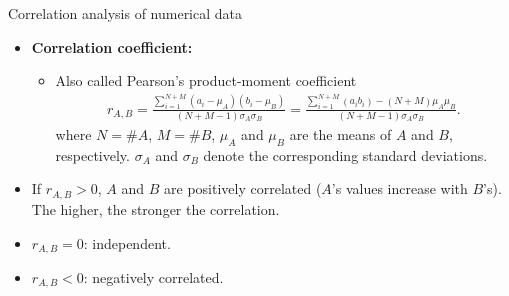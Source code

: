 \documentclass[aspectratio=169,t]{beamer}
\begin{document}
  { 
    \begin{frame}{Correlation analysis of numerical data}
    \begin{itemize}
      \item \textbf{\color{airforceblue}Correlation coefficient:}
      \begin{itemize}
        \item Also called Pearson's product-moment coefficient
        \begin{align}
          r_{A,B} = \frac{\sum_{i=1}^{N + M} (a_i-\mu_A)(b_i-\mu_B)}{(N+M-1)\sigma_A\sigma_B} = \frac{\sum_{i=1}^{N+M}(a_ib_i)-(N+M)\mu_A\mu_B}{(N+M-1) \sigma_A\sigma_B}.
        \end{align}
        where $N = \# A$, $M = \# B$, $\mu_A$ and $\mu_B$ are the means of $A$ and $B$, respectively. $\sigma_A$ and $\sigma_B$ denote the corresponding standard deviations.
      \end{itemize}
      \item If $r_{A,B} > 0$, $A$ and $B$ are positively correlated ($A$'s values increase with $B$'s). \\
      The higher, the stronger the correlation.
      \item $r_{A,B} = 0$: independent.
      \item $r_{A,B} < 0$: negatively correlated.
    \end{itemize}
    \end{frame}
  }
\end{document}
